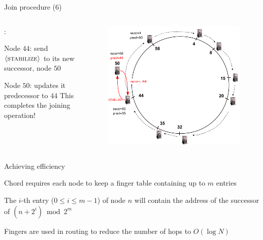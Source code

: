\begin{frame}{Join procedure (6)}

\begin{columns}
\begin{column}{0.4\textwidth}
:
\BI
\item Node $44$: send $\langle \textsc{stabilize} \rangle$ to its new successor, node $50$ 
\item Node $50$: updates it predecessor to $44$
\EI
This completes the joining operation!

\end{column}
\begin{column}{0.6\textwidth}
\begin{figure}
\includegraphics[width=1.0\textwidth]{chord-example7}
\end{figure}
\end{column}
\end{columns}

\end{frame}

\begin{frame}{Achieving efficiency}

\BIL
\item Chord requires each node to keep a \alert{finger table} containing 
up to $m$ entries
\item The $i$-th entry ($0 \leq i \leq m-1$) of node $n$ will contain the 
address of the successor of $(n + 2^{i}) \bmod 2^m$
\item Fingers are used in routing to reduce the number of hops to $O(\log N)$
\EIL
\end{frame}

